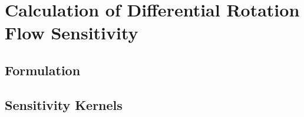 \chapter{Calculation of Differential Rotation Flow Sensitivity} 

\section{Formulation}

\section{Sensitivity Kernels}
